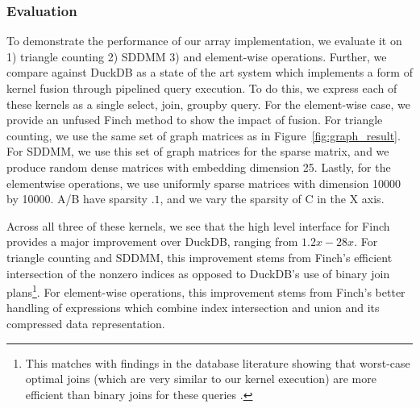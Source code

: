 \subsubsection{Evaluation}
To demonstrate the performance of our array implementation, we evaluate it on 1) triangle counting 2) SDDMM 3) and element-wise operations. Further, we compare against DuckDB as a state of the art system which implements a form of kernel fusion through pipelined query execution. To do this, we express each of these kernels as a single select, join, groupby query. For the element-wise case, we provide an unfused Finch method to show the impact of fusion. For triangle counting, we use the same set of graph matrices as in Figure~\ref{fig:graph_result}. For SDDMM, we use this set of graph matrices for the sparse matrix, and we produce random dense matrices with embedding dimension 25. Lastly, for the elementwise operations, we use uniformly sparse matrices with dimension 10000 by 10000. A/B have sparsity $.1$, and we vary the sparsity of C in the X axis.


Across all three of these kernels, we see that the high level interface for Finch provides a major improvement over DuckDB, ranging from $1.2x-28x$. For triangle counting and SDDMM, this improvement stems from Finch's efficient intersection of the nonzero indices as opposed to DuckDB's use of binary join plans\footnote{This matches with findings in the database literature showing that worst-case optimal joins (which are very similar to our kernel execution) are more efficient than binary joins for these queries \cite{wang2023free}.}. For element-wise operations, this improvement stems from Finch's better handling of expressions which combine index intersection and union and its compressed data representation.

